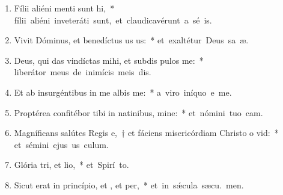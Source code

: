 \begin{flushleft}
\begin{enumerate}[leftmargin=*]
\item Fílii aliéni menti sunt hi,~* \mbox{fílii aliéni inveteráti sunt, et claudicavérunt a sé is.}

\item Vivit Dóminus, et benedíctus us us:~* \mbox{et exaltétur Deus sa æ.}

\item Deus, qui das vindíctas mihi, et subdis pulos  me:~* \mbox{liberátor meus de inimícis meis dis.}

\item Et ab insurgéntibus in me albis me:~* \mbox{a viro iníquo e me.}

\item Proptérea confitébor tibi in natinibus, mine:~* \mbox{et nómini tuo  cam.}

\item Magníficans salútes Regis e,~† et fáciens misericórdiam Christo o vid:~* \mbox{et sémini ejus us  culum.}

\item Glória tri, et lio,~* \mbox{et Spirí to.}

\item Sicut erat in princípio, et , et per,~* \mbox{et in sǽcula sæcu. men.}

\end{enumerate}
\end{flushleft}

